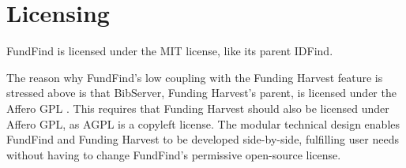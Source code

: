 \section{Licensing}

FundFind is licensed under the MIT license, like its parent IDFind. %

The reason why FundFind's low coupling with the Funding Harvest feature is stressed above is that BibServer, Funding Harvest's parent, is licensed under the Affero GPL \cite{bibserver-src}. This requires that Funding Harvest should also be licensed under Affero GPL, as AGPL is a copyleft license. The modular technical design enables FundFind and Funding Harvest to be developed side-by-side, fulfilling user needs without having to change FundFind's permissive open-source license.
